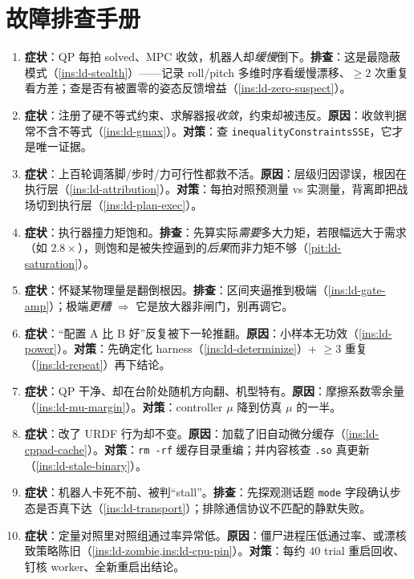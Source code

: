 \section*{故障排查手册}
\begin{enumerate}
  \item \textbf{症状}：QP 每拍 solved、MPC 收敛，机器人却\emph{缓慢}倒下。\textbf{排查}：这是最隐蔽模式（\cref{ins:ld-stealth}）——记录 roll/pitch 多维时序看缓慢漂移、$\ge 2$ 次重复看方差；查是否有被置零的姿态反馈增益（\cref{ins:ld-zero-suspect}）。
  \item \textbf{症状}：注册了硬不等式约束、求解器报\emph{收敛}，约束却被违反。\textbf{原因}：收敛判据常不含不等式（\cref{ins:ld-gmax}）。\textbf{对策}：查 \texttt{inequalityConstraintsSSE}，它才是唯一证据。
  \item \textbf{症状}：上百轮调落脚/步时/力可行性都救不活。\textbf{原因}：层级归因谬误，根因在执行层（\cref{ins:ld-attribution}）。\textbf{对策}：每拍对照预测量 vs 实测量，背离即把战场切到执行层（\cref{ins:ld-plan-exec}）。
  \item \textbf{症状}：执行器撞力矩饱和。\textbf{排查}：先算实际\emph{需要}多大力矩，若限幅远大于需求（如 $2.8\times$），则饱和是被失控逼到的\emph{后果}而非力矩不够（\cref{pit:ld-saturation}）。
  \item \textbf{症状}：怀疑某物理量是翻倒根因。\textbf{排查}：区间夹逼推到极端（\cref{ins:ld-gate-amp}）；极端\emph{更糟} $\Rightarrow$ 它是放大器非闸门，别再调它。
  \item \textbf{症状}：“配置 A 比 B 好”反复被下一轮推翻。\textbf{原因}：小样本无功效（\cref{ins:ld-power}）。\textbf{对策}：先确定化 harness（\cref{ins:ld-determinize}）+ $\ge 3$ 重复（\cref{ins:ld-repeat}）再下结论。
  \item \textbf{症状}：QP 干净、却在台阶处随机方向翻、机型特有。\textbf{原因}：摩擦系数零余量（\cref{ins:ld-mu-margin}）。\textbf{对策}：controller $\mu$ 降到仿真 $\mu$ 的一半。
  \item \textbf{症状}：改了 URDF 行为却不变。\textbf{原因}：加载了旧自动微分缓存（\cref{ins:ld-cppad-cache}）。\textbf{对策}：\texttt{rm -rf} 缓存目录重编；并内容核查 \texttt{.so} 真更新（\cref{ins:ld-stale-binary}）。
  \item \textbf{症状}：机器人卡死不前、被判“stall”。\textbf{排查}：先探观测话题 \texttt{mode} 字段确认步态是否真下达（\cref{ins:ld-transport}）；排除通信协议不匹配的静默失败。
  \item \textbf{症状}：定量对照里对照组通过率异常低。\textbf{原因}：僵尸进程压低通过率、或漂核致策略陈旧（\cref{ins:ld-zombie,ins:ld-cpu-pin}）。\textbf{对策}：每约 $40$ trial 重启回收、钉核 worker、全新重启出结论。
\end{enumerate}
